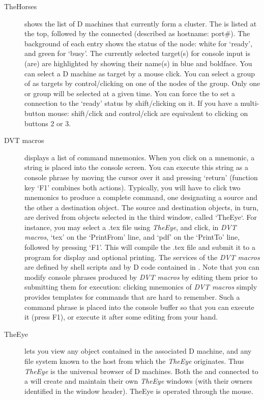 \begin{description}
\item[TheHorses] shows the list of D machines that currently form a cluster. The  is listed at the top, followed by the connected  (described as hostname: port\#). The background of each entry shows the status of the node: white for `ready', and green for `busy'. The currently selected target(s) for console input is (are) are highlighted by showing their name(s) in blue and boldface. You can select a D machine as target by a mouse click. You can select a group of  as targets by control/clicking on one of the nodes of the group. Only one  or group will be selected at a given time. You can force the  to set a  connection to the `ready' status by shift/clicking on it. If you have a multi-button mouse: shift/click and control/click are equivalent to clicking on buttons 2 or 3.

\item[DVT macros] displays a list of command mnemonics. When you click on a mnemonic, a string is placed into the console screen. You can execute this string as a console phrase by moving the cursor over it and pressing `return' (function key `F1' combines both actions). Typically, you will have to click two mnemonics to produce a complete command, one designating a source and the other a destination object. The source and destination objects, in turn, are derived from objects selected in the third window, called `TheEye`. For instance, you may select a .tex file using \emph{TheEye}, and click, in \emph{DVT macros}, `tex' on the `PrintFrom' line, and `pdf' on the `PrintTo' line, followed by pressing `F1'. This will compile the .tex file and submit it to a program for display and optional printing. The services of the \emph{DVT macros} are defined by shell scripts and by D code contained in . Note that you can modify console phrases produced by \emph{DVT macros} by editing them prior to submitting them for execution: clicking mnemonics of \emph{DVT macros} simply provides templates for commands that are hard to remember. Such a command phrase is placed into the console buffer so that you can execute it (press F1), or execute it after some editing from your hand.

\item[TheEye] lets you view any object contained in the associated D machine, and any file system known to the host from which the \emph{TheEye} originates. Thus \emph{TheEye} is the universal browser of D machines. Both the  and  connected to a  will create and maintain their own \emph{TheEye} windows (with their owners identified in the window header). TheEye is operated through the mouse.


\end{description}

